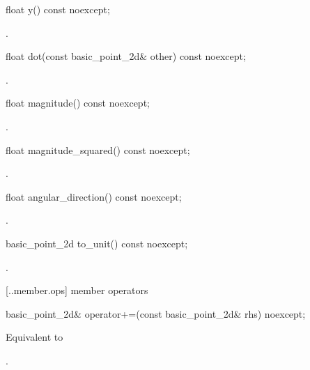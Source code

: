 %
\begin{itemdecl}
float y() const noexcept;
\end{itemdecl}
\begin{itemdescr}
\pnum \returns {}.
\end{itemdescr}

%
\begin{itemdecl}
float dot(const basic_point_2d& other) const noexcept;
\end{itemdecl}
\begin{itemdescr}
\pnum \returns {}.
\end{itemdescr}

%
\begin{itemdecl}
float magnitude() const noexcept;
\end{itemdecl}
\begin{itemdescr}
\pnum \returns {}.
\end{itemdescr}

%
\begin{itemdecl}
float magnitude_squared() const noexcept;
\end{itemdecl}
\begin{itemdescr}
\pnum \returns {}.
\end{itemdescr}

%
\begin{itemdecl}
float angular_direction() const noexcept;
\end{itemdecl}
\begin{itemdescr}
\pnum \returns {}.
\end{itemdescr}

%
\begin{itemdecl}
basic_point_2d to_unit() const noexcept;
\end{itemdecl}
\begin{itemdescr}
\pnum \returns {}.
\end{itemdescr}

 [\iotwod.\pointtwod.member.ops] { member operators}

%
\begin{itemdecl}
basic_point_2d& operator+=(const basic_point_2d& rhs) noexcept;
\end{itemdecl}
\begin{itemdescr}
\pnum \effects Equivalent to 
	
\pnum \returns {}.
\end{itemdescr}

